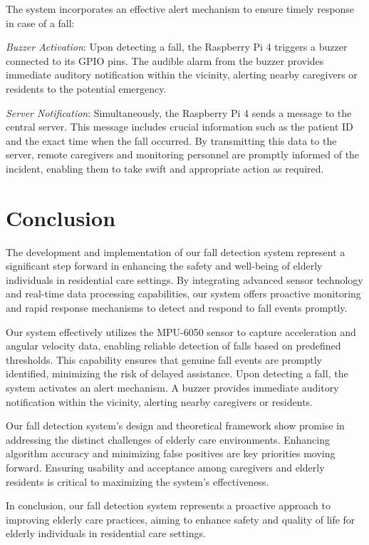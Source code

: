 \documentclass[final,5p,times,twocolumn,authoryear]{elsarticle}
\begin{document}
The system incorporates an effective alert mechanism to ensure timely response in case of a fall: 
\vspace{\baselineskip}

\textit{Buzzer Activation}: Upon detecting a fall, the Raspberry Pi 4 triggers a buzzer connected to its GPIO pins. The audible alarm from the buzzer provides immediate auditory notification within the vicinity, alerting nearby caregivers or residents to the potential emergency. 
\vspace{\baselineskip}

\textit{Server Notification}: Simultaneously, the Raspberry Pi 4 sends a message to the central server. This message includes crucial information such as the patient ID and the exact time when the fall occurred. By transmitting this data to the server, remote caregivers and monitoring personnel are promptly informed of the incident, enabling them to take swift and appropriate action as required. 

\section{Conclusion}

The development and implementation of our fall detection system represent a significant step forward in enhancing the safety and well-being of elderly individuals in residential care settings. By integrating advanced sensor technology and real-time data processing capabilities, our system offers proactive monitoring and rapid response mechanisms to detect and respond to fall events promptly. 

Our system effectively utilizes the MPU-6050 sensor to capture acceleration and angular velocity data, enabling reliable detection of falls based on predefined thresholds. This capability ensures that genuine fall events are promptly identified, minimizing the risk of delayed assistance. Upon detecting a fall, the system activates an alert mechanism. A buzzer provides immediate auditory notification within the vicinity, alerting nearby caregivers or residents. 

Our fall detection system's design and theoretical framework show promise in addressing the distinct challenges of elderly care environments. Enhancing algorithm accuracy and minimizing false positives are key priorities moving forward. Ensuring usability and acceptance among caregivers and elderly residents is critical to maximizing the system's effectiveness. 

In conclusion, our fall detection system represents a proactive approach to improving elderly care practices, aiming to enhance safety and quality of life for elderly individuals in residential care settings. 
\end{document}

